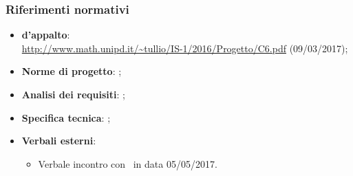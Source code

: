 \documentclass[../PianoDiQualifica.tex]{subfiles}
\begin{document}
			\subsubsection{Riferimenti normativi}
    			\begin{itemize}
    				\item \textbf{ d'appalto}:\\
    				\url{http://www.math.unipd.it/~tullio/IS-1/2016/Progetto/C6.pdf} (09/03/2017);
    				\item \textbf{Norme di progetto}: \normediprogettov;
    				\item \textbf{Analisi dei requisiti}: \analisideirequisitiv;
    				\item \textbf{Specifica tecnica}: \specificatecnicav;
    				\item \textbf{Verbali esterni}:
    				\begin{itemize}
    					\item Verbale incontro con \proponente\ in data 05/05/2017.
    				\end{itemize}
				\end{itemize}
\end{document}
